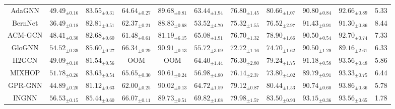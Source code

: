 \documentclass{article}
\theoremstyle{plain}
\newcommand{\pjn}{{INGNN}}
\begin{document}
\begin{table*}[htb]
\begin{tabular}{c|ccccccccc|c}
AdaGNN     & $49.49_{\pm 0.16}$    & $83.55_{\pm 0.31}$    & $64.64_{\pm 0.27}$    & $89.68_{\pm 0.81}$    & $63.44_{\pm 1.94}$ & $76.80_{\pm 1.45}$ & $80.66_{\pm 1.07}$ & $90.80_{\pm 0.84}$ & $92.66_{\pm 0.89}$    &   5.33   \\
BernNet    & $36.49_{\pm 0.18}$    & $82.81_{\pm 0.51}$    & $62.37_{\pm 0.21}$    & $88.83_{\pm 0.68}$    & $53.52_{\pm 4.70}$ & $75.32_{\pm 1.55}$ & $76.52_{\pm 2.97}$ & $91.43_{\pm 0.91}$ & $91.30_{\pm 0.86}$    &   8.44    \\
ACM-GCN    & $48.41_{\pm 0.30}$    & $82.68_{\pm 0.60}$    & $61.48_{\pm 0.61}$    & $81.19_{\pm 6.15}$    & $65.08_{\pm 1.91}$ & $76.70_{\pm 1.32}$ & $78.90_{\pm 1.66}$ & $90.50_{\pm 0.54}$ & $92.70_{\pm 0.74}$    &   7.33    \\
GloGNN     & $54.52_{\pm 0.39}$    & {\color[HTML]{FF0000} $\mathbf{85.60_{\pm 0.27}}$}    & {\color[HTML]{FF0000} $\mathbf{66.34_{\pm 0.29}}$}   &  {\color[HTML]{FF0000} $\mathbf{90.91_{\pm 0.13}}$}  & $55.72_{\pm 3.09}$ & $72.72_{\pm 1.16}$ & $74.70_{\pm 1.62}$ & $90.50_{\pm 1.29}$ & $89.16_{\pm 2.61}$    &  6.33     \\
\midrule
H2GCN     & $49.09_{\pm 0.10}$    & $81.54_{\pm 0.56}$      & OOM      & OOM      & $64.40_{\pm 1.44}$    & $76.30_{\pm 2.80}$    & $79.24_{\pm 1.75}$    & $91.18_{\pm 0.58}$    & {\color[HTML]{0000FF} $93.56_{\pm 0.48}$}    &  5.86    \\
MIXHOP    & $51.78_{\pm 0.26}$    & $83.63_{\pm 0.54}$    & $65.65_{\pm 0.30}$    & $90.61_{\pm 0.24}$ & $56.98_{\pm 4.80}$    & $76.14_{\pm 2.37}$    & $73.80_{\pm 4.02}$    & $89.79_{\pm 0.91}$    & $93.33_{\pm 0.75}$    &  6.44      \\
GPR-GNN   & $44.89_{\pm 0.20}$    & $81.12_{\pm 0.63}$    & $62.00_{\pm 0.25}$    & $90.02_{\pm 0.13}$    & $64.72_{\pm 1.59}$    & {\color[HTML]{0000FF} $79.12_{\pm 0.87}$}    & $80.44_{\pm 1.53}$    & $90.74_{\pm 0.60}$    & {\color[HTML]{FF0000} $\mathbf{93.86_{\pm 0.36}}$} &   5.78     \\
\midrule
\pjn  &{\color[HTML]{FF0000} $\mathbf{56.53_{\pm 0.15}}$} & {\color[HTML]{0000FF} $85.44_{\pm 0.60}$} & {\color[HTML]{0000FF} $66.07_{\pm 0.11}$} & $89.73_{\pm 0.51}$    & {\color[HTML]{FF0000} $\mathbf{69.82_{\pm 1.08}}$} & {\color[HTML]{FF0000} $\mathbf{79.98_{\pm 1.57}}$} & {\color[HTML]{FF0000} $\mathbf{83.50_{\pm 0.93}}$} & {\color[HTML]{FF0000} $\mathbf{93.15_{\pm 0.36}}$} & {\color[HTML]{0000FF} $93.56_{\pm 0.65}$} & 1.78 \\
\bottomrule
\end{tabular}
\vspace{-10pt}
\end{table*}
  
\end{document}
